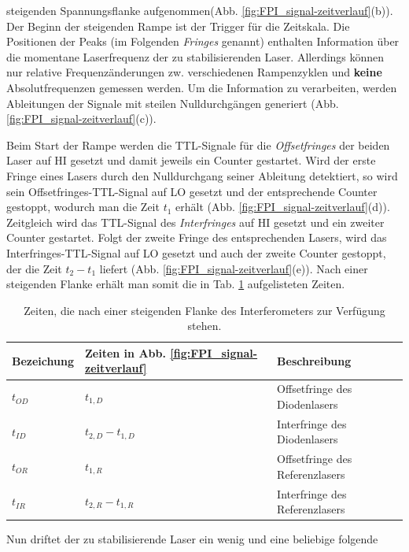 steigenden Spannungsflanke aufgenommen(Abb.
\ref{fig:FPI_signal-zeitverlauf}(b)). Der Beginn der steigenden Rampe ist der
Trigger für die Zeitskala. Die Positionen der Peaks (im Folgenden
\textit{Fringes} genannt) enthalten Information über die momentane
Laserfrequenz der zu stabilisierenden Laser. Allerdings können nur relative Frequenzänderungen zw.
verschiedenen Rampenzyklen und \textbf{keine} Absolutfrequenzen gemessen
werden. Um die Information zu verarbeiten, werden Ableitungen der Signale mit
steilen Nulldurchgängen generiert (Abb.
\ref{fig:FPI_signal-zeitverlauf}(c)).\par
Beim Start der Rampe werden die TTL-Signale für die \textit{Offsetfringes} der
beiden Laser auf HI gesetzt und damit jeweils ein Counter gestartet. Wird der
erste Fringe eines Lasers durch den Nulldurchgang seiner Ableitung detektiert,
so wird sein Offsetfringes-TTL-Signal auf LO gesetzt und der entsprechende
Counter gestoppt, wodurch man die Zeit $t_1$ erhält (Abb.
\ref{fig:FPI_signal-zeitverlauf}(d)). Zeitgleich wird das TTL-Signal des
\textit{Interfringes} auf HI gesetzt und ein zweiter Counter gestartet.
Folgt der zweite Fringe des entsprechenden Lasers, wird das
Interfringes-TTL-Signal auf LO gesetzt und auch der zweite Counter gestoppt, der
die Zeit $t_2-t_1$ liefert (Abb. \ref{fig:FPI_signal-zeitverlauf}(e)). Nach
einer steigenden Flanke erhält man somit die in Tab. \ref{tab:laserzeiten}
aufgelisteten Zeiten.\par
\begin{table}
	\begin{tabular}{p{}p{}p{}}
		\toprule
		Bezeichung & Zeiten in Abb. \ref{fig:FPI_signal-zeitverlauf} & Beschreibung \\
		\midrule[1px]
		\hline
		$t_{OD}$ & $t_{1,D}$ & Offsetfringe des Diodenlasers \\
		$t_{ID}$ & $t_{2,D}-t_{1,D}$ & Interfringe des Diodenlasers \\
		$t_{OR}$ & $t_{1,R}$ & Offsetfringe des Referenzlasers \\
		$t_{IR}$ & $t_{2,R}-t_{1,R}$ & Interfringe des Referenzlasers \\
		\bottomrule[1px]
	\end{tabular}
	\caption[Fringezeiten]{Zeiten, die nach einer steigenden Flanke des
	Interferometers zur Verfügung stehen.}
	\label{tab:laserzeiten}
\end{table}
Nun driftet der zu stabilisierende Laser ein wenig und eine beliebige folgende
